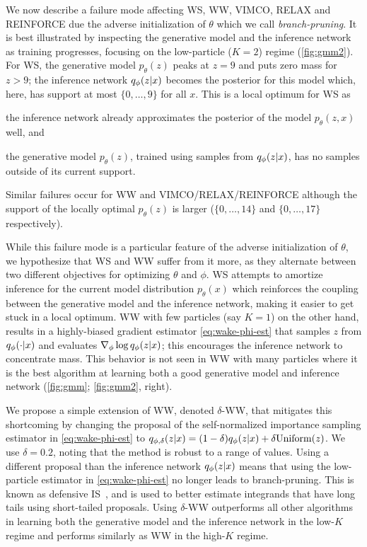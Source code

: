 We now describe a failure mode affecting \gls{WS}, \gls{WW}, \gls{VIMCO}, \acrshort{RELAX} and \acrshort{REINFORCE} due the adverse initialization of $\theta$ which we call \emph{branch-pruning}.
It is best illustrated by inspecting the generative model and the inference network as training progresses, focusing on the low-particle ($K = 2$) regime (\cref{fig:gmm2}).
For \gls{WS}, the generative model $p_\theta(z)$ peaks at $z = 9$ and puts zero mass for $z > 9$; the inference network $q_\phi(z \lvert x)$ becomes the posterior for this model which, here, has support at most $\{0, \dotsc, 9\}$ for all $x$.
This is a local optimum for \gls{WS} as
\begin{inparaenum}[(i)]
\item the inference network already approximates the posterior of the model $p_\theta(z, x)$ well, and
\item the generative model $p_\theta(z)$, trained using samples from $q_\phi(z \lvert x)$, has no samples outside of its current support. %
\end{inparaenum}
Similar failures occur for \gls{WW} and \gls{VIMCO}/\acrshort{RELAX}/\acrshort{REINFORCE} although the support of the locally optimal $p_\theta(z)$ is larger ($\{0, \dotsc, 14\}$ and $\{0, \dotsc, 17\}$ respectively).

While this failure mode is a particular feature of the adverse initialization of $\theta$, we hypothesize that \gls{WS} and \gls{WW} suffer from it more, as they alternate between two different objectives for optimizing $\theta$ and $\phi$.
\Gls{WS} attempts to amortize inference for the current model distribution $p_\theta(x)$ which reinforces the coupling between the generative model and the inference network, making it easier to get stuck in a local optimum.
\Gls{WW} with few particles (say $K = 1$) on the other hand, results in a highly-biased gradient estimator \cref{eq:wake-phi-est} that samples $z$ from $q_\phi(\cdot \lvert x)$ and evaluates $\nabla_\phi \log q_\phi(z \lvert x)$; this encourages the inference network to concentrate mass.
This behavior is not seen in \gls{WW} with many particles where it is the best algorithm at learning both a good generative model and inference network (\cref{fig:gmm}; \cref{fig:gmm2}, right).


We propose a simple extension of \gls{WW}, denoted $\delta$-\acrshort{WW}, that mitigates this shortcoming by changing the proposal of the self-normalized importance sampling estimator in \cref{eq:wake-phi-est} to \(q_{\phi, \delta}(z \lvert x) = (1 - \delta) q_\phi(z \lvert x) + \delta \mathrm{Uniform}(z)\).
We use $\delta = 0.2$, noting that the method is robust to a range of values.
Using a different proposal than the inference network $q_\phi(z \lvert x)$ means that using the low-particle estimator in \cref{eq:wake-phi-est} no longer leads to branch-pruning.
This is known as defensive \acrlong{IS}~\citep{Hesterberg1995weighted}, and is used to better estimate integrands that have long tails using short-tailed proposals.
Using $\delta$-\gls{WW} outperforms all other algorithms in learning both the generative model and the inference network in the low-$K$ regime and performs similarly as \gls{WW} in the high-$K$ regime.


